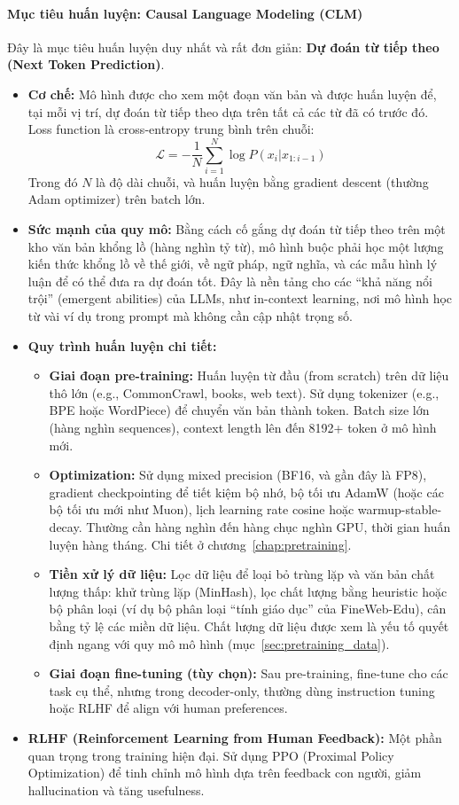 \paragraph{Mục tiêu huấn luyện: Causal Language Modeling (CLM)}
Đây là mục tiêu huấn luyện duy nhất và rất đơn giản: \textbf{Dự đoán từ tiếp theo (Next Token Prediction)}.
\begin{itemize}
	\item \textbf{Cơ chế:} Mô hình được cho xem một đoạn văn bản và được huấn luyện để, tại mỗi vị trí, dự đoán từ tiếp theo dựa trên tất cả các từ đã có trước đó. Loss function là cross-entropy trung bình trên chuỗi:
	\[
	\mathcal{L} = -\frac{1}{N} \sum_{i=1}^N \log P(x_i | x_{1:i-1})
	\]
	Trong đó $N$ là độ dài chuỗi, và huấn luyện bằng gradient descent (thường Adam optimizer) trên batch lớn.
	\item \textbf{Sức mạnh của quy mô:} Bằng cách cố gắng dự đoán từ tiếp theo trên một kho văn bản khổng lồ (hàng nghìn tỷ từ), mô hình buộc phải học một lượng kiến thức khổng lồ về thế giới, về ngữ pháp, ngữ nghĩa, và các mẫu hình lý luận để có thể đưa ra dự đoán tốt. Đây là nền tảng cho các “khả năng nổi trội” (emergent abilities) của LLMs, như in-context learning, nơi mô hình học từ vài ví dụ trong prompt mà không cần cập nhật trọng số.
	\item \textbf{Quy trình huấn luyện chi tiết:} 
	\begin{itemize}
		\item \textbf{Giai đoạn pre-training:} Huấn luyện từ đầu (from scratch) trên dữ liệu thô lớn (e.g., CommonCrawl, books, web text). Sử dụng tokenizer (e.g., BPE hoặc WordPiece) để chuyển văn bản thành token. Batch size lớn (hàng nghìn sequences), context length lên đến 8192+ token ở mô hình mới.
		\item \textbf{Optimization:} Sử dụng mixed precision (BF16, và gần đây là FP8), gradient checkpointing để tiết kiệm bộ nhớ, bộ tối ưu AdamW (hoặc các bộ tối ưu mới như Muon), lịch learning rate cosine hoặc warmup-stable-decay. Thường cần hàng nghìn đến hàng chục nghìn GPU, thời gian huấn luyện hàng tháng. Chi tiết ở chương~\ref{chap:pretraining}.
		\item \textbf{Tiền xử lý dữ liệu:} Lọc dữ liệu để loại bỏ trùng lặp và văn bản chất lượng thấp: khử trùng lặp (MinHash), lọc chất lượng bằng heuristic hoặc bộ phân loại (ví dụ bộ phân loại “tính giáo dục” của FineWeb-Edu), cân bằng tỷ lệ các miền dữ liệu. Chất lượng dữ liệu được xem là yếu tố quyết định ngang với quy mô mô hình (mục~\ref{sec:pretraining_data}).
		\item \textbf{Giai đoạn fine-tuning (tùy chọn):} Sau pre-training, fine-tune cho các task cụ thể, nhưng trong decoder-only, thường dùng instruction tuning hoặc RLHF để align với human preferences.
	\end{itemize}
	\item \textbf{RLHF (Reinforcement Learning from Human Feedback):} Một phần quan trọng trong training hiện đại. Sử dụng PPO (Proximal Policy Optimization) để tinh chỉnh mô hình dựa trên feedback con người, giảm hallucination và tăng usefulness.
\end{itemize}


